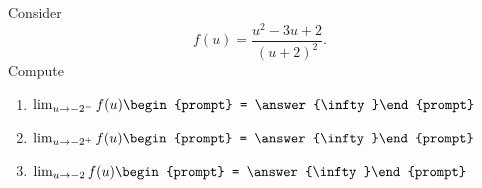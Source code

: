 \documentclass{ximera}
\author{Bart Snapp}
\begin{document}
\begin{exercise}
Consider 
\[
f(u) = \frac{u^2-3 u+2}{(u+2)^2}.
\]
Compute
\begin{enumerate}
\item $\lim_{u\to -2^- } f(u) \begin{prompt} = \answer{\infty}\end{prompt}$
\item $\lim_{u\to -2^+ } f(u) \begin{prompt} = \answer{\infty}\end{prompt}$
\item $\lim_{u\to -2 } f(u) \begin{prompt} = \answer{\infty}\end{prompt}$
\end{enumerate}
\end{exercise}
\end{document}
